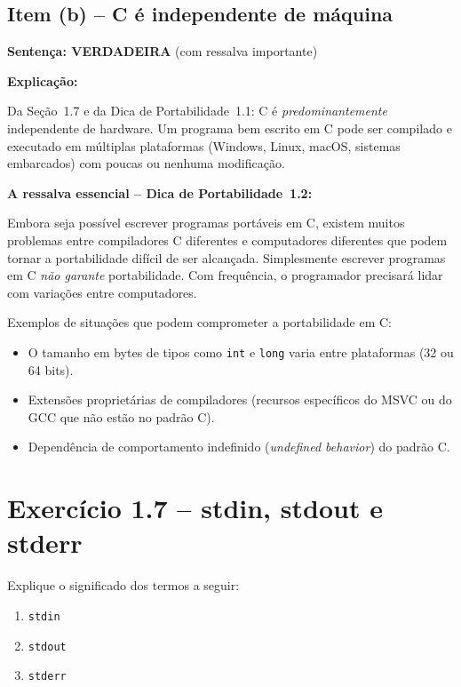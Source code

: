 \documentclass[12pt,a4paper]{article}
\begin{document}
\subsection*{Item (b) -- C é independente de máquina}

\begin{verdadeiroBox}
\textbf{Sentença: VERDADEIRA} (com ressalva importante)

\medskip
\textbf{Explicação:}

Da Seção~1.7 e da Dica de Portabilidade~1.1: C é \textit{predominantemente} independente
de hardware. Um programa bem escrito em C pode ser compilado e executado em múltiplas
plataformas (Windows, Linux, macOS, sistemas embarcados) com poucas ou nenhuma
modificação.

\medskip
\textbf{A ressalva essencial -- Dica de Portabilidade~1.2:}
\end{verdadeiroBox}

\begin{portab}
  Embora seja possível escrever programas portáveis em C, existem muitos problemas
  entre compiladores C diferentes e computadores diferentes que podem tornar a
  portabilidade difícil de ser alcançada. Simplesmente escrever programas em C
  \textit{não garante} portabilidade. Com frequência, o programador precisará lidar
  com variações entre computadores.
\end{portab}

Exemplos de situações que podem comprometer a portabilidade em C:
\begin{itemize}
  \item O tamanho em bytes de tipos como \texttt{int} e \texttt{long} varia entre
  plataformas (32 ou 64 bits).
  \item Extensões proprietárias de compiladores (recursos específicos do MSVC ou do GCC
  que não estão no padrão C).
  \item Dependência de comportamento indefinido (\textit{undefined behavior}) do padrão C.
\end{itemize}

\newpage

\section{Exercício 1.7 -- stdin, stdout e stderr}

\begin{enunciadoBox}[Enunciado]
Explique o significado dos termos a seguir:
\begin{enumerate}
  \item \texttt{stdin}
  \item \texttt{stdout}
  \item \texttt{stderr}
\end{enumerate}
\end{enunciadoBox}
\end{document}
